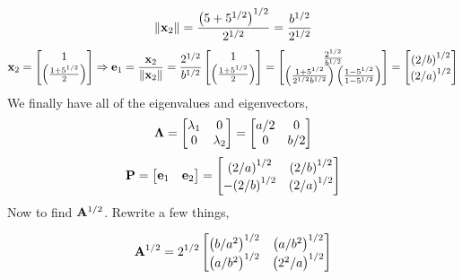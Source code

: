         \[
            {\left\|\bold{x}_2\right\|} = \frac{{\left(5 + 5^{1/2}\right)}^{1/2}}{2^{1/2}} = \frac{b^{1/2}}{2^{1/2}}
        \]
        \[
            \bold{x}_2
            =
            \begin{bmatrix}
                1 \\
                \left(\frac{1 + 5^{1/2}}{2}\right)
            \end{bmatrix}
            \Rightarrow
            \bold{e}_1
            =
            \frac{\bold{x}_2}{\left\|\bold{x}_2\right\|}
            =
            \frac{2^{1/2}}{b^{1/2}}
            \begin{bmatrix}
                1 \\
                \left(\frac{1 + 5^{1/2}}{2}\right)
            \end{bmatrix}
            =
            \begin{bmatrix}
                \frac{2^{1/2}}{b^{1/2}} \\
                \left(\frac{1 + 5^{1/2}}{2^{1/2}b^{1/2}}\right) \left(\frac{1 - 5^{1/2}}{1 - 5^{1/2}}\right)
            \end{bmatrix}
            =
            \begin{bmatrix}
                {\left(2/b\right)}^{1/2} \\
                {\left(2/a\right)}^{1/2}
            \end{bmatrix}
        \]
        We finally have all of the eigenvalues and eigenvectors,
        \[
            \bold{\Lambda} 
            =
            \begin{bmatrix}
                \lambda_1 & 0 \\
                0 & \lambda_2
            \end{bmatrix}
            =
            \begin{bmatrix}
                a/2 & 0 \\
                0 & b/2
            \end{bmatrix}
        \]
        \[
            \bold{P}
            =
            \begin{bmatrix}
                \bold{e}_1 & \bold{e}_2
            \end{bmatrix}
            =
            \begin{bmatrix}
                {\left(2/a\right)}^{1/2} & {\left(2/b\right)}^{1/2} \\
                -{\left(2/b\right)}^{1/2} & {\left(2/a\right)}^{1/2}
            \end{bmatrix}
        \]
        Now to find $\bold{A}^{1/2}$. Rewrite a few things,
        
        \[
            \bold{A}^{1/2}
            =
            2^{1/2}
            \begin{bmatrix}
                {\left(b/a^2\right)}^{1/2} & {\left(a/b^2\right)}^{1/2} \\
                {\left(a/b^2\right)}^{1/2} & {\left(2^2/a\right)}^{1/2}
            \end{bmatrix}
        \]